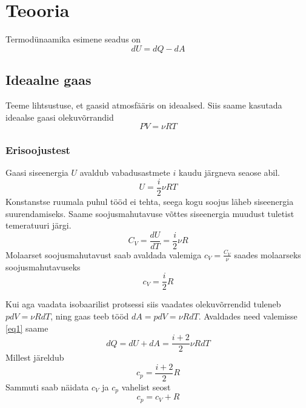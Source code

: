 \documentclass{trkut}%
\begin{document}
\maketitle%
\tableofcontents%

\nummerdame%


\chapter{Teooria}

Termodünaamika esimene seadus on
\begin{equation}\label{eq1}
dU = dQ - dA
\end{equation}

\section{Ideaalne gaas}
Teeme lihtsustuse, et gaasid atmosfääris on ideaalsed. Siis saame kasutada ideaalse gaasi olekuvõrrandid
\begin{equation}\label{eq8}
PV=\nu RT
\end{equation}

\subsection{Erisoojustest}
Gaasi siseenergia $U$ avaldub vabadusastmete $i$ kaudu järgneva seaose abil.
\begin{equation}\label{eq5}
U = \frac{i}{2} \nu R T
\end{equation}
Konstanstse ruumala puhul tööd ei tehta, seega kogu soojus läheb siseenergia suurendamiseks. Saame soojusmahutavuse võttes siseenergia muudust tuletist temeratuuri järgi.
\begin{equation}\label{eq6}
C_V = \frac{dU}{dT}=\frac{i}{2}\nu R
\end{equation}
Molaarset soojusmahutavust saab avaldada valemiga $c_V = \frac{C_V}{\nu}$ saades molaarseks soojusmahutavuseks
\begin{equation}\label{eq7}
c_V = \frac{i}{2}R
\end{equation}

Kui aga vaadata isobaarilist protsessi siis vaadates olekuvõrrendid tuleneb $pdV=\nu RdT$, ning gaas teeb tööd $dA = pdV = \nu RdT$. Avaldades need valemisse \ref{eq1} saame
\begin{equation}
dQ = dU + dA = \frac{i+2}{2} \nu R dT
\end{equation}
Millest järeldub
\begin{equation}
c_p=\frac{i+2}{2}R
\end{equation}
Sammuti saab näidata $c_V$ ja $c_p$ vahelist seost
\begin{equation}\label{eq9}
c_p = c_V + R
\end{equation}
          
\end{document}
